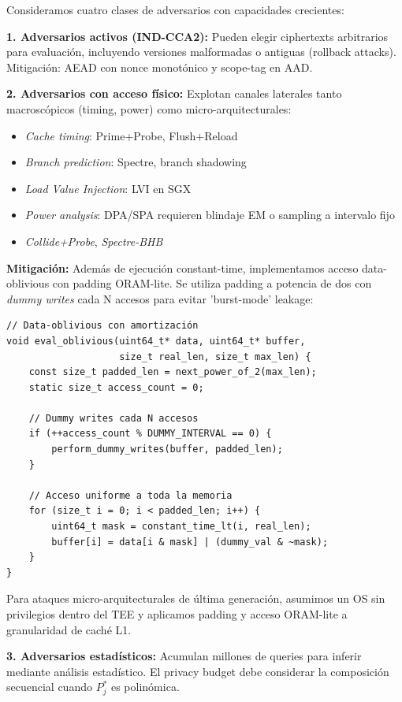 \documentclass[11pt]{article}
\theoremstyle{plain}
\begin{document}
Consideramos cuatro clases de adversarios con capacidades crecientes:

\textbf{1. Adversarios activos (IND-CCA2):} Pueden elegir ciphertexts arbitrarios para evaluación, incluyendo versiones malformadas o antiguas (rollback attacks). Mitigación: AEAD con nonce monotónico y scope-tag en AAD.

\textbf{2. Adversarios con acceso físico:} Explotan canales laterales tanto macroscópicos (timing, power) como micro-arquitecturales:
\begin{itemize}
    \item \textit{Cache timing}: Prime+Probe, Flush+Reload
    \item \textit{Branch prediction}: Spectre, branch shadowing  
    \item \textit{Load Value Injection}: LVI en SGX
    \item \textit{Power analysis}: DPA/SPA requieren blindaje EM o sampling a intervalo fijo
    \item \textit{Collide+Probe}, \textit{Spectre-BHB}
\end{itemize}

\textbf{Mitigación:} Además de ejecución constant-time, implementamos acceso data-oblivious con padding ORAM-lite. Se utiliza padding a potencia de dos con \textit{dummy writes} cada N accesos para evitar 'burst-mode' leakage:

\begin{verbatim}
// Data-oblivious con amortización
void eval_oblivious(uint64_t* data, uint64_t* buffer, 
                    size_t real_len, size_t max_len) {
    const size_t padded_len = next_power_of_2(max_len);
    static size_t access_count = 0;
    
    // Dummy writes cada N accesos
    if (++access_count % DUMMY_INTERVAL == 0) {
        perform_dummy_writes(buffer, padded_len);
    }
    
    // Acceso uniforme a toda la memoria
    for (size_t i = 0; i < padded_len; i++) {
        uint64_t mask = constant_time_lt(i, real_len);
        buffer[i] = data[i & mask] | (dummy_val & ~mask);
    }
}
\end{verbatim}

Para ataques micro-arquitecturales de última generación, asumimos un OS sin privilegios dentro del TEE y aplicamos padding y acceso ORAM-lite a granularidad de caché L1.

\textbf{3. Adversarios estadísticos:} Acumulan millones de queries para inferir mediante análisis estadístico. El privacy budget debe considerar la composición secuencial cuando $P^*_j$ es polinómica.
\end{document}
